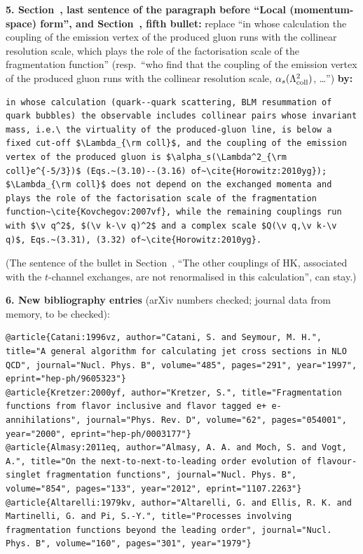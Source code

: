 \noindent\textbf{5. Section~, last sentence of the paragraph before ``Local (momentum-space) form'', and Section~, fifth bullet:} replace ``in whose calculation the coupling of the emission vertex of the produced gluon runs with the collinear resolution scale, which plays the role of the factorisation scale of the fragmentation function'' (resp.\ ``who find that the coupling of the emission vertex of the produced gluon runs with the collinear resolution scale, $\alpha_s(\Lambda^2_{\rm coll})$, \ldots'') \textbf{by:}
\begin{lstlisting}
in whose calculation (quark--quark scattering, BLM resummation of quark bubbles) the observable includes collinear pairs whose invariant mass, i.e.\ the virtuality of the produced-gluon line, is below a fixed cut-off $\Lambda_{\rm coll}$, and the coupling of the emission vertex of the produced gluon is $\alpha_s(\Lambda^2_{\rm coll}e^{-5/3})$ (Eqs.~(3.10)--(3.16) of~\cite{Horowitz:2010yg}); $\Lambda_{\rm coll}$ does not depend on the exchanged momenta and plays the role of the factorisation scale of the fragmentation function~\cite{Kovchegov:2007vf}, while the remaining couplings run with $\v q^2$, $(\v k-\v q)^2$ and a complex scale $Q(\v q,\v k-\v q)$, Eqs.~(3.31), (3.32) of~\cite{Horowitz:2010yg}.
\end{lstlisting}
(The sentence of the bullet in Section~, ``The other couplings of HK, associated with the $t$-channel exchanges, are not renormalised in this calculation'', can stay.)

\noindent\textbf{6. New bibliography entries} (arXiv numbers checked; journal data from memory, to be checked):
\begin{lstlisting}
@article{Catani:1996vz, author="Catani, S. and Seymour, M. H.", title="A general algorithm for calculating jet cross sections in NLO QCD", journal="Nucl. Phys. B", volume="485", pages="291", year="1997", eprint="hep-ph/9605323"}
@article{Kretzer:2000yf, author="Kretzer, S.", title="Fragmentation functions from flavor inclusive and flavor tagged e+ e- annihilations", journal="Phys. Rev. D", volume="62", pages="054001", year="2000", eprint="hep-ph/0003177"}
@article{Almasy:2011eq, author="Almasy, A. A. and Moch, S. and Vogt, A.", title="On the next-to-next-to-leading order evolution of flavour-singlet fragmentation functions", journal="Nucl. Phys. B", volume="854", pages="133", year="2012", eprint="1107.2263"}
@article{Altarelli:1979kv, author="Altarelli, G. and Ellis, R. K. and Martinelli, G. and Pi, S.-Y.", title="Processes involving fragmentation functions beyond the leading order", journal="Nucl. Phys. B", volume="160", pages="301", year="1979"}
\end{lstlisting}

